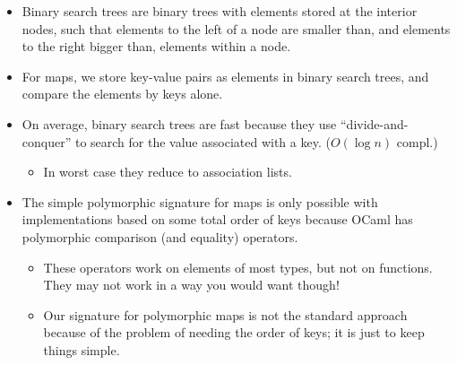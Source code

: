 \documentclass{beamer}
\begin{document}
\begin{itemize}
  \item Binary search trees are binary trees with elements stored at the
  interior nodes, such that elements to the left of a node are smaller than,
  and elements to the right bigger than, elements within a node.
  
  \item For maps, we store key-value pairs as elements in binary search trees,
  and compare the elements by keys alone.
  
  \item On average, binary search trees are fast because they use
  ``divide-and-conquer'' to search for the value associated with a key. ($O
  (\log n)$ compl.)
  \begin{itemize}
    \item In worst case they reduce to association lists.
  \end{itemize}
  \item The simple polymorphic signature for maps is only possible with
  implementations based on some total order of keys because OCaml has
  polymorphic comparison (and equality) operators.
  \begin{itemize}
    \item These operators work on elements of most types, but not on
    functions. They may not work in a way you would want though!
    
    \item Our signature for polymorphic maps is not the standard approach
    because of the problem of needing the order of keys; it is just to keep
    things simple.
  \end{itemize}
\end{itemize}
\end{document}

